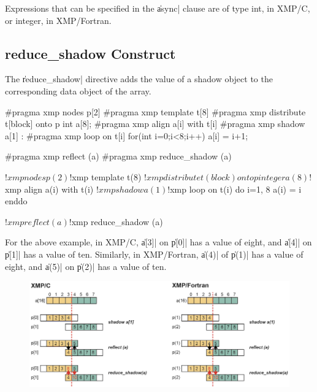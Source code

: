 \begin{mynote}
Expressions that can be specified in the \|async| clause are
of type int, in XMP/C, or integer, in XMP/Fortran.
\end{mynote}


\subsection{{\bf reduce\_shadow} Construct}

The \|reduce_shadow| directive adds the value of a shadow object to the
corresponding data object of the array.

\begin{XCexample}
#pragma xmp nodes p[2]
#pragma xmp template t[8]
#pragma xmp distribute t[block] onto p
int a[8];
#pragma xmp align a[i] with t[i]
#pragma xmp shadow a[1]
 :
#pragma xmp loop on t[i]
  for(int i=0;i<8;i++)
    a[i] = i+1;

#pragma xmp reflect (a)
#pragma xmp reduce_shadow (a)
\end{XCexample}

\begin{XFexample}
!$xmp nodes p(2)
!$xmp template t(8)
!$xmp distribute t(block) onto p
  integer a(8)
!$xmp align a(i) with t(i)
!$xmp shadow a(1)

!$xmp loop on t(i)
  do i=1, 8
    a(i) = i
  enddo

!$xmp reflect (a)
!$xmp reduce_shadow (a)
\end{XFexample}


For the above example, in XMP/C, \|a[3]| on \|p[0]| has a value of eight,
and \|a[4]| on \|p[1]| has a value of ten. Similarly, in XMP/Fortran,
\|a(4)| of \|p(1)| has a value of eight, and \|a(5)| on \|p(2)| has a
value of ten.

\begin{figure}
  \centering
  \includegraphics[width=\textwidth]{figs/reduce_shadow.png}
\end{figure}

